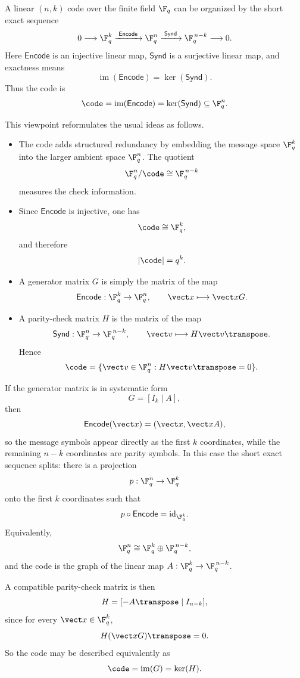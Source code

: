 \newpage
\begin{flushleft}\color{blue}
\begin{remark}
	A linear \((n,k)\) code over the finite field \(\F_q\) can be organized by the short exact sequence
	\[
	0 \longrightarrow \F_q^k \xrightarrow{\;\mathsf{Encode}\;} \F_q^n \xrightarrow{\;\mathsf{Synd}\;} \F_q^{\,n-k} \longrightarrow 0.
	\]
	Here \(\mathsf{Encode}\) is an injective linear map, \(\mathsf{Synd}\) is a surjective linear map, and exactness means
	\[
	\operatorname{im}(\mathsf{Encode})=\ker(\mathsf{Synd}).
	\]
	Thus the code is
	\[
	\code=\operatorname{im}(\mathsf{Encode})=\ker(\mathsf{Synd})\subseteq \F_q^n.
	\]
	
	This viewpoint reformulates the usual ideas as follows.
	
	\begin{itemize}
		\item The code adds structured redundancy by embedding the message space \(\F_q^k\) into the larger ambient space \(\F_q^n\). The quotient
		\[
		\F_q^n/\code \cong \F_q^{\,n-k}
		\]
		measures the check information.
		
		\item Since \(\mathsf{Encode}\) is injective, one has
		\[
		\code \cong \F_q^k,
		\]
		and therefore
		\[
		|\code|=q^k.
		\]
		
		\item A generator matrix \(G\) is simply the matrix of the map
		\[
		\mathsf{Encode}:\F_q^k\to \F_q^n,
		\qquad
		\vect x \longmapsto \vect x G.
		\]
		
		\item A parity-check matrix \(H\) is the matrix of the map
		\[
		\mathsf{Synd}:\F_q^n\to \F_q^{\,n-k},
		\qquad
		\vect v \longmapsto H\vect v\transpose.
		\]
		Hence
		\[
		\code=\{\vect v\in \F_q^n : H\vect v\transpose=0\}.
		\]
	\end{itemize}
	
	If the generator matrix is in systematic form
	\[
	G=[I_k\mid A],
	\]
	then
	\[
	\mathsf{Encode}(\vect x)=(\vect x,\vect xA),
	\]
	so the message symbols appear directly as the first \(k\) coordinates, while the remaining \(n-k\) coordinates are parity symbols. In this case the short exact sequence splits:
	there is a projection
	\[
	p:\F_q^n\to \F_q^k
	\]
	onto the first \(k\) coordinates such that
	\[
	p\circ \mathsf{Encode}=\mathrm{id}_{\F_q^k}.
	\]
	Equivalently,
	\[
	\F_q^n \cong \F_q^k \oplus \F_q^{\,n-k},
	\]
	and the code is the graph of the linear map \(A:\F_q^k\to \F_q^{\,n-k}\).
	
	A compatible parity-check matrix is then
	\[
	H=[-A\transpose\mid I_{n-k}],
	\]
	since for every \(\vect x\in \F_q^k\),
	\[
	H(\vect xG)\transpose=0.
	\]
	So the code may be described equivalently as
	\[
	\code=\operatorname{im}(G)=\ker(H).
	\]
\end{remark}
\end{flushleft}
